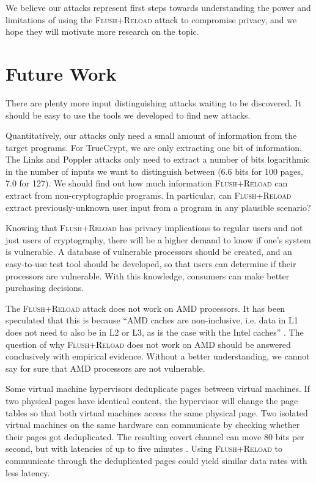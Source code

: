 \documentclass[letterpaper,twocolumn,10pt]{article}
\begin{document}
We believe our attacks represent first steps towards understanding the power and
limitations of using the \textsc{Flush+Reload} attack to compromise privacy, and
we hope they will motivate more research on the topic.

\section{Future Work}
\label{sec:future}

There are plenty more input distinguishing attacks waiting to be discovered. It
should be easy to use the tools we developed to find new attacks.

Quantitatively, our attacks only need a small amount of information from the
target programs. For TrueCrypt, we are only extracting one bit of information.
The Links and Poppler attacks only need to extract a number of bits logarithmic
in the number of inputs we want to distinguish between (6.6 bits for 100 pages,
7.0 for 127). We should find out how much information \textsc{Flush+Reload} can
extract from non-cryptographic programs. In particular, can
\textsc{Flush+Reload} extract previously-unknown user input from a program in
any plausible scenario?

Knowing that \textsc{Flush+Reload} has privacy implications to regular users and
not just users of cryptography, there will be a higher demand to know if one's
system is vulnerable. A database of vulnerable processors should be created, and
an easy-to-use test tool should be developed, so that users can determine if
their processors are vulnerable. With this knowledge, consumers can make better
purchasing decisions.

The \textsc{Flush+Reload} attack does not work on AMD processors. It has been
speculated that this is because ``AMD caches are non-inclusive, i.e. data in L1
does not need to also be in L2 or L3, as is the case with the Intel caches''
\cite{yarom2013flush}. The question of why \textsc{Flush+Reload} does not work
on AMD should be answered conclusively with empirical evidence. Without a better
understanding, we cannot say for sure that AMD processors are not vulnerable. 

Some virtual machine hypervisors deduplicate pages between virtual machines. If
two physical pages have identical content, the hypervisor will change the page
tables so that both virtual machines access the same physical page. Two isolated
virtual machines on the same hardware can communicate by checking whether their
pages got deduplicated. The resulting covert channel can move 80 bits per
second, but with latencies of up to five minutes \cite{xiao2013security}. Using
\textsc{Flush+Reload} to communicate through the deduplicated pages could yield
similar data rates with less latency.
\end{document}
